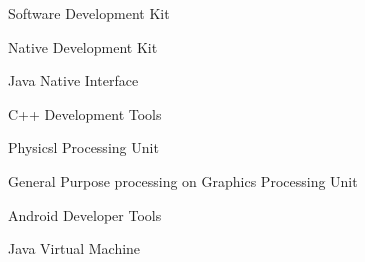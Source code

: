 \suppressfloats[t]

\begin{description}[\setleftmargin{65pt}\setlabelstyle{\bfseries}]
    \leftskip=1cm

	\item[$SDK$]      	Software Development Kit
    \item[$NDK$]      	Native Development Kit
    \item[$JNI$]      	Java Native Interface
    \item[$CDT$]        C++ Development Tools
    \item[$PPU$]        Physicsl Processing Unit
    \item[$GPGPU$]      General Purpose processing on Graphics Processing Unit
    \item[$ADT$]        Android Developer Tools
    \item[$JVM$]        Java Virtual Machine
\end{description}
